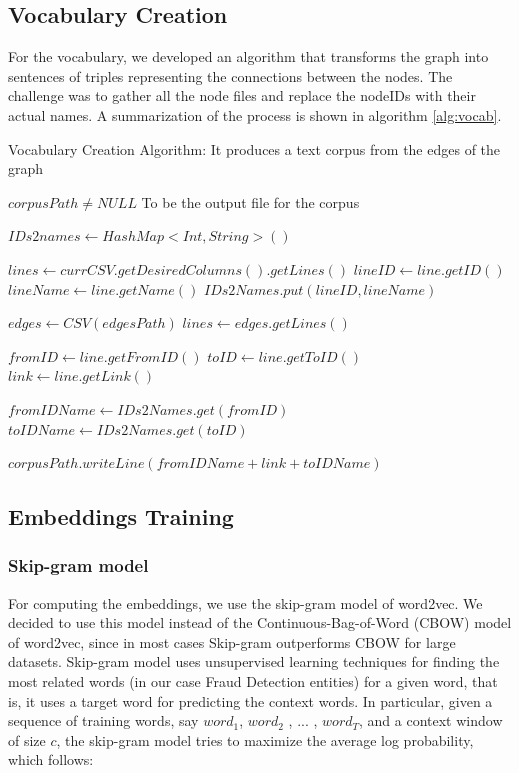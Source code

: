 \documentclass[sigconf, nonacm]{acmart}
\begin{document}
\subsection{Vocabulary Creation}
For the vocabulary, we developed an algorithm that transforms the graph into sentences of triples representing the connections between the nodes. The challenge was to gather all the node files and replace the nodeIDs with their actual names. A summarization of the process is shown in algorithm \ref{alg:vocab}.
\begin{algorithm}
\caption{Vocabulary Creation Algorithm: It produces a text corpus from the edges of the graph}\label{alg:vocab}
\begin{algorithmic}
\Require $corpusPath \neq NULL$ To be the output file for the corpus

\State
{}
\State $IDs2names \gets HashMap<Int,String>()$

    \State $lines \gets currCSV.getDesiredColumns().getLines()$
        \State $lineID \gets line.getID()$
        \State $lineName \gets line.getName()$
        \State $IDs2Names.put(lineID, lineName)$
    \EndFor
\EndFor

\State
{}

\State $edges \gets CSV(edgesPath)$
\State $lines \gets edges.getLines()$

    \State $fromID \gets line.getFromID()$
    \State $toID \gets line.getToID()$
    \State $link \gets line.getLink()$
    
    \State $fromIDName \gets IDs2Names.get(fromID)$
    \State $toIDName \gets IDs2Names.get(toID)$
    
    \State $corpusPath.writeLine(fromIDName + link + toIDName)$
\EndFor

\end{algorithmic}
\end{algorithm}

\subsection{Embeddings Training}
\subsubsection{Skip-gram model} 
For computing the embeddings,  we use the skip-gram model of word2vec. We decided to use this model instead of the Continuous-Bag-of-Word (CBOW) model of word2vec, since in most cases Skip-gram outperforms CBOW for large datasets. Skip-gram model uses unsupervised learning techniques for finding the most related words (in our case Fraud Detection entities) for a given word, that is, it uses a target word for predicting the context words. 
In particular, given a sequence of training words, say $word_1$, $word_2$ , ... , $word_T$, and a context window of size $c$, the skip-gram model tries to maximize the average log probability, which follows:
\end{document}
